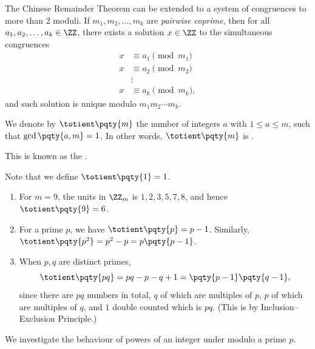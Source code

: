 \begin{remark}
    The Chinese Remainder Theorem can be extended to a system of congruences to more than 2 moduli. If \(m_1, m_2, \ldots, m_k\) are \emph{pairwise coprime}, then for all \(a_1, a_2, \ldots, a_k \in \ZZ\), there exists a solution \(x \in \ZZ\) to the simultaneous congruences
    \begin{align*}
        x &\equiv a_1 \pmod{m_1} \\
        x &\equiv a_2 \pmod{m_2} \\
          &\vdots \\
        x &\equiv a_k \pmod{m_k},
    \end{align*}
    and such solution is unique modulo \(m_1 m_2 \cdots m_k\).
\end{remark}

\begin{definition}
    We denote by \(\totient\pqty{m}\) the number of integers \(a\) with \(1 \leq a \leq m\), such that \(\gcd\pqty{a, m} = 1\). In other words, \(\totient\pqty{m}\) is .
    
    This is known as the .

    Note that we define \(\totient\pqty{1} = 1\).
\end{definition}


\begin{examples}
    \begin{enumerate}
        \item For \(m = 9\), the units in \(\ZZ_m\) is \(1, 2, 3, 5, 7, 8\), and hence \(\totient\pqty{9} = 6\).
        \item For a prime \(p\), we have \(\totient\pqty{p} = p - 1\). Similarly, \(\totient\pqty{p^2} = p^2 - p = p \pqty{p - 1}\).
        \item When \(p, q\) are distinct primes,
        \[
            \totient\pqty{pq} = pq - p - q + 1 = \pqty{p - 1} \pqty{q - 1},
        \]
        since there are \(pq\) numbers in total, \(q\) of which are multiples of \(p\), \(p\) of which are multiples of \(q\), and \(1\) double counted which is \(pq\). (This is by Inclusion--Exclusion Principle.)
    \end{enumerate}
\end{examples}

We investigate the behaviour of powers of an integer under modulo a prime \(p\).

